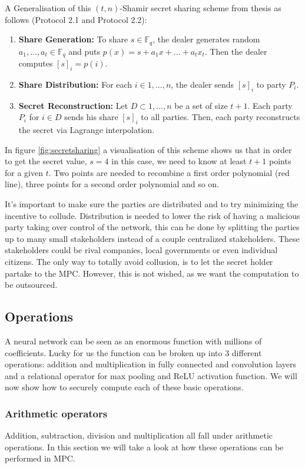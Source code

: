 A Generalisation of this $(t,n)$-Shamir secret sharing scheme from thesis \cite{de2012design} as follows (Protocol 2.1 and Protocol 2.2):
\begin{enumerate}
  \item \textbf{Share Generation:} To share $s \in \mathbb{F}_q$, the dealer generates random $a_1, ..., a_t \in \mathbb{F}_q$ and puts $p(x) = s + a_1x + ... + a_tx_t$. Then the dealer computes $[s]_i = p(i)$.
  \item \textbf{Share Distribution:} For each $i \in {1, ..., n}$, the dealer sends $[s]_i$ to party $P_i$.
  \item \textbf{Secret Reconstruction:} Let $D \subset {1, ..., n}$ be a set of size $t + 1$. Each party $P_i$ for $i \in D$ sends his share $[s]_i$ to all parties. Then, each party reconstructs the secret via Lagrange interpolation.
\end{enumerate}
In figure \ref{fig:secretsharing} a visualisation of this scheme shows us that in order to get the secret value, $s=4$ in this case, we need to know at least $t+1$ points for a given $t$. Two points are needed to recombine a first order polynomial (red line), three points for a second order polynomial and so on.

It's important to make sure the parties are distributed and to try minimizing the incentive to collude. Distribution is needed to lower the risk of having a malicious party taking over control of the network, this can be done by splitting the parties up to many small stakeholders instead of a couple centralized stakeholders. These stakeholders could be rival companies, local governments or even individual citizens. The only way to totally avoid collusion, is to let the secret holder partake to the MPC.  However, this is not wished, as we want the computation to be outsourced.

\subsection{Operations}
A neural network can be seen as an enormous function with millions of coefficients. Lucky for us the function can be broken up into 3 different operations: addition and multiplication in fully connected and convolution layers and a relational operator for max pooling and ReLU activation function. We will now show how to securely compute each of these basic operations.

\subsubsection{Arithmetic operators}
\label{Arithmetic operators}
Addition, subtraction, division and multiplication all fall under arithmetic operations. In this section we will take a look at how these operations can be performed in MPC.
